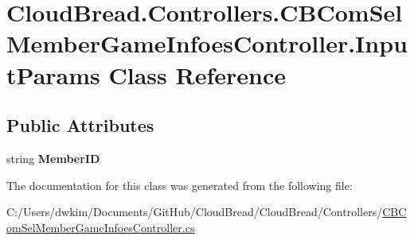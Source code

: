 \hypertarget{a00103}{}\section{Cloud\+Bread.\+Controllers.\+C\+B\+Com\+Sel\+Member\+Game\+Infoes\+Controller.\+Input\+Params Class Reference}
\label{a00103}
\subsection*{Public Attributes}
\begin{DoxyCompactItemize}
\item 
string {\bfseries Member\+ID}\hypertarget{a00103_aafa44f0953da399515aecc1cf9011cc4}{}\label{a00103_aafa44f0953da399515aecc1cf9011cc4}

\end{DoxyCompactItemize}


The documentation for this class was generated from the following file\+:\begin{DoxyCompactItemize}
\item 
C\+:/\+Users/dwkim/\+Documents/\+Git\+Hub/\+Cloud\+Bread/\+Cloud\+Bread/\+Controllers/\hyperlink{a00203}{C\+B\+Com\+Sel\+Member\+Game\+Infoes\+Controller.\+cs}\end{DoxyCompactItemize}
